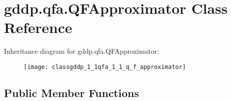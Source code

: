 \hypertarget{classgddp_1_1qfa_1_1_q_f_approximator}{}\section{gddp.\+qfa.\+Q\+F\+Approximator Class Reference}
\label{classgddp_1_1qfa_1_1_q_f_approximator}
Inheritance diagram for gddp.\+qfa.\+Q\+F\+Approximator\+:\begin{figure}[H]
\begin{center}
\leavevmode
\texttt{[image: classgddp\_1\_1qfa\_1\_1\_q\_f\_approximator]}
\end{center}
\end{figure}
\subsection*{Public Member Functions}
